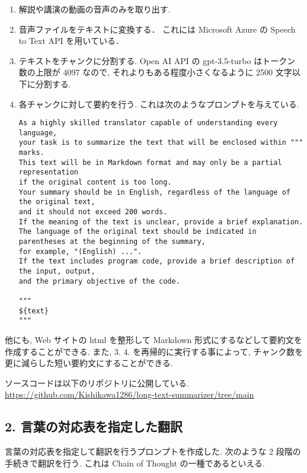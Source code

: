 \documentclass[uplatex, a4j, 10pt, fleqn, dvipdfmx]{article}
\begin{document}
\begin{enumerate}
    \item
          解説や講演の動画の音声のみを取り出す.
    \item
          音声ファイルをテキストに変換する．
          これには Microsoft Azure の Speech to Text API を用いている．
    \item
          テキストをチャンクに分割する.
          Open AI API の gpt-3.5-turbo はトークン数の上限が 4097 なので, それよりもある程度小さくなるように 2500 文字以下に分割する.
    \item
          各チャンクに対して要約を行う.
          これは次のようなプロンプトを与えている.
          \begin{lstlisting}[caption = 文章要約のプロンプト, label = program1]
As a highly skilled translator capable of understanding every language,
your task is to summarize the text that will be enclosed within """ marks.
This text will be in Markdown format and may only be a partial representation
if the original content is too long.
Your summary should be in English, regardless of the language of the original text,
and it should not exceed 200 words.
If the meaning of the text is unclear, provide a brief explanation.
The language of the original text should be indicated in parentheses at the beginning of the summary,
for example, "(English) ...".
If the text includes program code, provide a brief description of the input, output,
and the primary objective of the code.

"""
${text}
"""
          \end{lstlisting}
\end{enumerate}

他にも, Web サイトの html を整形して Markdown 形式にするなどして要約文を作成することができる.
また, 3. 4. を再帰的に実行する事によって, チャンク数を更に減らした短い要約文にすることができる.

ソースコードは以下のリポジトリに公開している.\\
\url{https://github.com/Kishikawa1286/long-text-summarizer/tree/main}

\subsection*{2. 言葉の対応表を指定した翻訳}

言葉の対応表を指定して翻訳を行うプロンプトを作成した.
次のような 2 段階の手続きで翻訳を行う. これは Chain of Thought \cite{ref3} の一種であるといえる.
\end{document}
